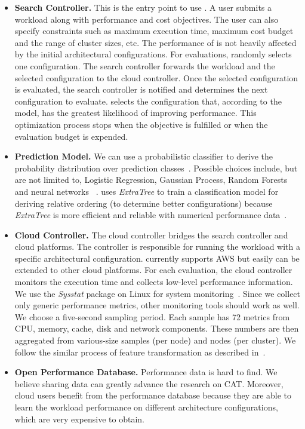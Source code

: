 \begin{itemize}
\item \textbf{Search Controller.}
This is the entry point to use \scout.
A user submits a workload along with performance and cost objectives.
The user can also specify constraints such as maximum execution time,
maximum cost budget and the range of cluster sizes, etc.
The performance of \scout is not heavily affected by
the initial architectural configurations.
For evaluations, \scout randomly selects one configuration.
The search controller forwards the workload and the selected configuration
to the cloud controller.
Once the selected configuration is evaluated,
the search controller is notified and determines
the next configuration to evaluate.
\scout selects the configuration that, according to the model, has the
greatest likelihood of improving performance.
This optimization process stops when the objective is fulfilled or
when the evaluation budget is expended.

\item \textbf{Prediction Model.}
We can use a probabilistic classifier to derive the probability distribution
over prediction classes~\cite{friedman2001elements}.
Possible choices include, but are not limited to,
Logistic Regression, Gaussian Process, Random Forests and neural networks
~\cite{breiman2001random,friedman2001elements}.
\scout uses \emph{ExtraTree}
to train a classification model
for deriving relative ordering (to determine better configurations)
because \emph{ExtraTree} is more efficient and reliable
with
numerical performance data~\cite{geurts2006extremely}.

\item \textbf{Cloud Controller.}
The cloud controller bridges the search controller and cloud platforms.
The controller is responsible for running the workload
with a specific architectural configuration.
\scout currently supports AWS but easily can be extended
to other cloud platforms.
For each evaluation, the cloud controller monitors the execution time and
collects low-level performance information.
We use the \emph{Sysstat} package on Linux for system monitoring~\cite{sysstat}.
Since we collect only generic performance metrics, other monitoring tools
should work as well.
We choose a five-second sampling period.
Each sample has 72 metrics from
CPU, memory, cache, disk and network components.
These numbers are then aggregated from various-size
samples (per node) and nodes (per cluster).
We follow the similar process of feature transformation
as described in~\cite{Hsu2016,Hsu2018Arrow}.

\item \textbf{Open Performance Database.}
Performance data is hard to find.
We believe sharing data can greatly advance the research
on CAT.
Moreover, cloud users benefit from the performance database because
they are able to learn the workload performance on
different architecture configurations, which are very expensive
to obtain.

\end{itemize}